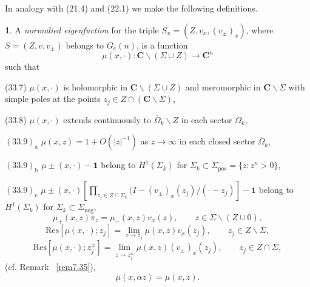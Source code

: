 \documentclass{surv-l}
\theoremstyle{plain}
\theoremstyle{definition}
\newtheorem{definition}[theorem]{\sc{Definition}}
\numberwithin{equation}{chapter}
\begin{document}
In analogy with (21.4) and (22.1) we make the following definitions.
\setcounter{theorem}{5}
\begin{definition}\label{defi33.6}
A \emph{normalied eigenfuction} for the triple $S_{x}=(Z, v_{x}, (v_{\pm} )_{x})$, where $S= (Z, v, v_{\pm})$ belongs to $G_{e}(n)$, is a function
\begin{equation*}
\mu(x, \cdot):\mathbf{C}\backslash (\Sigma\cup Z)\rightarrow \mathbf{C}^{n}
\end{equation*}
such that

(33.7) $\mu(x, \cdot)$ is holomorphic in $\mathbf{C}\backslash (\Sigma\cup Z)$ and meromorphic in $ \mathbf{C}\backslash \Sigma$ with simple poles at the points $z_{j}\in Z\cap(\mathbf{C}\backslash \Sigma)$,

(33.8) $\mu(x, \cdot)$ extends continuously to $\overline{\Omega}_{k}\backslash Z$ in each sector $\Omega_{k}$,

$(33.9)_{\mathrm{a}}$ $\mu(x,z)=\mathrm{1}+O(|z|^{-1})$ as $ z\rightarrow\infty$ in each closed sector $\overline{\Omega}_{k}$,

$(33.9)_{\mathrm{b}}$ $\mu\pm(x, \cdot)-\mathbf{1}$ belong to $H^{1}(\Sigma_{k})$ for $\Sigma_{k}\subset\Sigma_{\mathrm{pos}}=\{z:z^{n}>0\}$,

$(33.9)_{\mathrm{c}}$ $\mu\pm(x, \cdot)[\prod_{z_{j}\in Z\cap\Sigma_{k}}(I-(v_{\pm})_{x}(z_{j})/(\cdot-z_{j})]-\mathbf{1}$ belong to $H^{1}(\Sigma_{k})$ for $\Sigma_{k}\subset\Sigma_{\mathrm{neg}}$,
\setcounter{equation}{9}
\begin{equation}\label{eq33.10}
\mu_{+}(x, z)\pi_{z}=\mu_{-}(x, z)v_{x}(z),\qquad z\in\Sigma\backslash (Z\cup 0),
\end{equation}
\begin{equation}\label{eq33.11}
\mathrm{Res}[\mu(x, \cdot);z_{j}]=\lim_{z\rightarrow z_{j}}\mu(x,z)v_{x}(z_{j}),\qquad z_{j}\in Z\backslash \Sigma,
\end{equation}
\begin{equation*}
\mathrm{Res}[\mu(x, \cdot); z_{j}^{\pm}]=\lim_{z\rightarrow z_{j}^{\pm}}\mu(x, z)(v_{\pm})_{x}(z_{j}),\qquad z_{j}\in Z\cap\Sigma,
\end{equation*}
(cf. Remark ~\ref{rem7.35}),
\begin{equation}\label{eq33.12}
\mu(x, \alpha z)=\mu(x,z).
\end{equation}
\end{definition}
\end{document}
